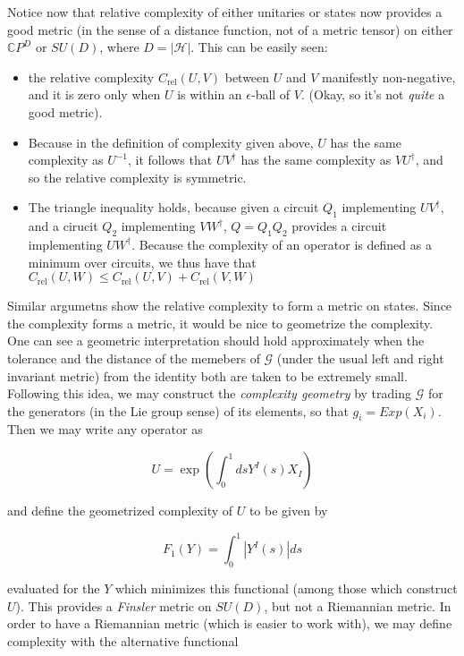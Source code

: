 \documentclass[12pt]{amsart}
\begin{document}
Notice now that relative complexity of either unitaries or states now provides a good metric (in the sense of a distance function, not of a metric tensor) on either $\mathbb{C}P^D$ or $SU(D)$, where $D = |\mathcal{H}|$. This can be easily seen:

\begin{itemize}

\item the relative complexity $C_{\text{rel}}(U,V)$ between $U$ and $V$ manifestly non-negative, and it is zero only when $U$ is within an $\epsilon$-ball of $V$. (Okay, so it's not {\it quite} a good metric).

\item Because in the definition of complexity given above, $U$ has the same complexity as $U^{-1}$, it follows that $UV^{\dagger}$ has the same complexity as $VU^{\dagger}$, and so the relative complexity is symmetric.

\item The triangle inequality holds, because given a circuit $Q_1$ implementing $UV^{\dagger}$, and a cirucit $Q_2$ implementing $VW^{\dagger}$, $Q = Q_1Q_2$ provides a circuit implementing $UW^{\dagger}$. Because the complexity of an operator is defined as a minimum over circuits, we thus have that $C_{\text{rel}}(U,W) \leq C_{\text{rel}}(U,V) + C_{\text{rel}}(V,W)$

\end{itemize}

Similar argumetns show the relative complexity to form a metric on states. Since the complexity forms a metric, it would be nice to geometrize the complexity. One can see a geometric interpretation should hold approximately when the tolerance and the distance of the memebers of $\mathcal{G}$ (under the usual left and right invariant metric) from the identity both are taken to be extremely small. Following this idea, we may construct the {\it complexity geometry} by trading $\mathcal{G}$ for the generators (in the Lie group sense) of its elements, so that $g_i = Exp(X_i)$. Then we may write any operator as 

$$U = \exp\left( \int_0^1 ds Y^I(s) X_I \right)$$

and define the geometrized complexity of $U$ to be given by

$$F_1(Y) = \int_0^1 \left|Y^I(s)\right| ds$$

evaluated for the $Y$ which minimizes this functional (among those which construct $U$). This provides a {\it Finsler} metric on $SU(D)$, but not a Riemannian metric. In order to have a Riemannian metric (which is easier to work with), we may define complexity with the alternative functional 
\end{document}
